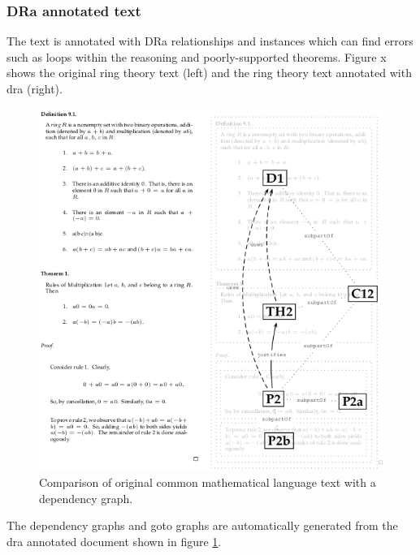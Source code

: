 \subsubsection{DRa annotated text}

The text is annotated with DRa relationships and instances which can find errors  such as loops within the reasoning and poorly-supported theorems. Figure x shows the original ring theory text (left) and the ring theory text annotated with \gls{dra} (right).

\begin{figure}[H]
\begin{center}
\includegraphics[scale=0.75]{Figures/Background/draforrings.png}
\end{center}
\caption{Comparison of original common mathematical language text with a dependency graph.
 \label{fig:ringdra}}
\end{figure}

The dependency graphs and goto graphs are automatically generated from the \gls{dra} annotated document shown in figure \ref{fig:ringdra}.

